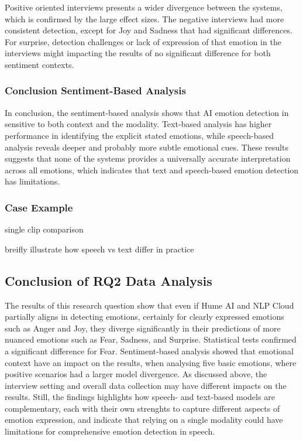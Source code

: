 Positive oriented interviews presents a wider divergence between the systems, which is confirmed by the large effect sizes. 
The negative interviews had more consistent detection, except for Joy and Sadness that had significant differences. 
For surprise, detection challenges or lack of expression of that emotion in the interviews might impacting the results of no significant difference for both sentiment contexts. 

\subsubsection{Conclusion Sentiment-Based Analysis}
In conclusion, the sentiment-based analysis shows that AI emotion detection in sensitive to both context and the modality. 
Text-based analysis has higher performance in identifying the explicit stated emotions, while speech-based 
analysis reveals deeper and probably more subtle emotional cues. 
These results suggests that none of the systems provides a universally accurate interpretation across all emotions,
which indicates that text and speech-based emotion detection has limitations. 


\subsubsection{Case Example}
single clip comparison 

breifly illustrate how speech vs text differ in practice 

\subsection{Conclusion of RQ2 Data Analysis}
The results of this research question show that even if Hume AI and NLP Cloud partially aligns in detecting emotions, certainly for clearly expressed emotions such as Anger and Joy, 
they diverge significantly in their predictions of more nuanced emotions such as Fear, Sadness, and Surprise. Statistical tests confirmed a significant difference for Fear. 
Sentiment-based analysis showed that emotional context have an impact on the results, when analysing five basic emotions, where positive scenarios had a larger model divergence. 
As discussed above, the interview setting and overall data collection may have different impacts on the results. Still, the findings highlights how speech- and text-based models are complementary, each 
with their own strenghts to capture different aspects of emotion expression, and indicate that relying on a single modality could have limitations for comprehensive emotion detection in speech.  


